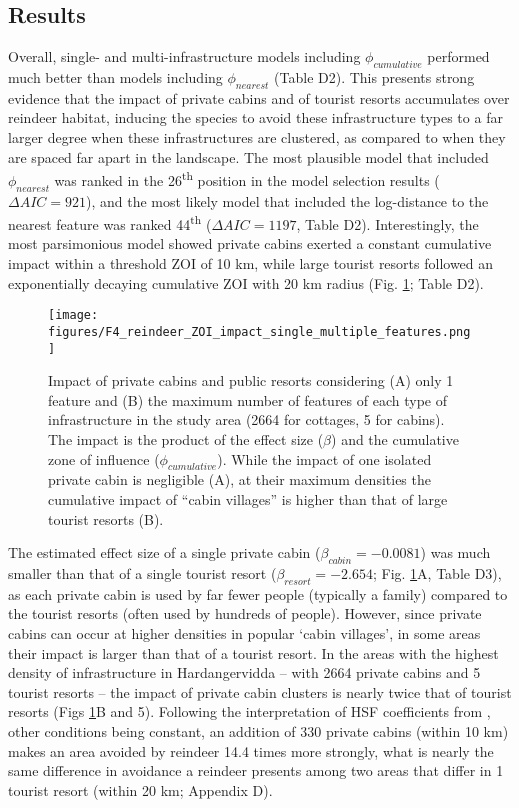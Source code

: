 \documentclass[titlepage]{article}
\begin{document}
\subsection{Results}

Overall, single- and multi-infrastructure models including $\phi_{cumulative}$ performed much better than models including $\phi_{nearest}$ (Table D2). This presents strong evidence that the impact of private cabins and of tourist resorts accumulates over reindeer habitat, inducing the species to avoid these infrastructure types to a far larger degree when these infrastructures are clustered, as compared to when they are spaced far apart in the landscape. The most plausible model that included $\phi_{nearest}$ was ranked in the 26\textsuperscript{th} position in the model selection results ($\Delta AIC = 921$), and the most likely model that included the log-distance to the nearest feature was ranked 44\textsuperscript{th} ($\Delta AIC = 1197$, Table D2). Interestingly, the most parsimonious model showed private cabins exerted a constant cumulative impact within a threshold ZOI of 10 km, while large tourist resorts followed an exponentially decaying cumulative ZOI with 20 km radius (Fig. \ref{fig:impact_plot}; Table D2). 

\begin{figure}[h]
\centering
\texttt{[image: figures/F4\_reindeer\_ZOI\_impact\_single\_multiple\_features.png]}
\caption{\label{fig:impact_plot} Impact of private cabins and public resorts considering (A) only 1 feature and (B) the maximum number of features of each type of infrastructure in the study area (2664 for cottages, 5 for cabins). The impact is the product of the effect size ($\beta$) and the cumulative zone of influence ($\phi_{cumulative}$). While the impact of one isolated private cabin is negligible (A), at their maximum densities the cumulative impact of “cabin villages” is higher than that of large tourist resorts (B).}
\end{figure}

The estimated effect size of a single private
cabin ($\beta_{cabin} = -0.0081$) was much smaller than that of a single tourist resort
($\beta_{resort} = -2.654$; Fig. \ref{fig:impact_plot}A, Table D3), as each private cabin is used by far fewer people (typically a family) compared to the tourist resorts (often used by hundreds of people). However, since private cabins can occur at higher densities in popular `cabin villages', in some areas their impact is larger than that of a tourist resort. In the areas with the highest density of infrastructure in Hardangervidda -- with 2664 private cabins and 5 tourist resorts -- the impact of 
private cabin clusters is nearly twice that of tourist resorts
(Figs \ref{fig:impact_plot}B and 5). Following the interpretation of HSF coefficients from \citet{fieberg_how_2021}, other conditions being constant, an addition of 330 private cabins (within 10 km) makes an area avoided by reindeer 14.4 times more strongly, what is nearly the same difference in avoidance a reindeer presents among two areas that differ in 1 tourist resort (within 20 km; Appendix D).
\end{document}
